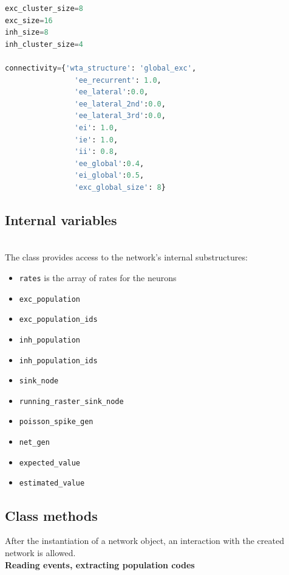 \begin{lstlisting}[language=Python, caption=WTA structure connectivity hyperparameters]
exc_cluster_size=8
exc_size=16
inh_size=8
inh_cluster_size=4

connectivity={'wta_structure': 'global_exc',
                'ee_recurrent': 1.0,
                'ee_lateral':0.0,
                'ee_lateral_2nd':0.0,
                'ee_lateral_3rd':0.0,
                'ei': 1.0,
                'ie': 1.0,
                'ii': 0.8,
                'ee_global':0.4,
                'ei_global':0.5,
                'exc_global_size': 8}
\end{lstlisting}

\subsection{Internal variables}

\\

\noindent The class provides access to the network's internal substructures:

\begin{itemize}
    \item \verb|rates| is the array of rates for the neurons 
    \item \verb|exc_population|
    \item \verb|exc_population_ids|
    \item \verb|inh_population|
    \item \verb|inh_population_ids|
    \item \verb|sink_node|
    \item \verb|running_raster_sink_node|
    \item \verb|poisson_spike_gen|
    \item \verb|net_gen|
    \item \verb|expected_value|
    \item \verb|estimated_value|
\end{itemize}


\subsection{Class methods}

After the instantiation of a  network object, an interaction with the created network is allowed.\\

\noindent\textbf{Reading events, extracting population codes}\\


